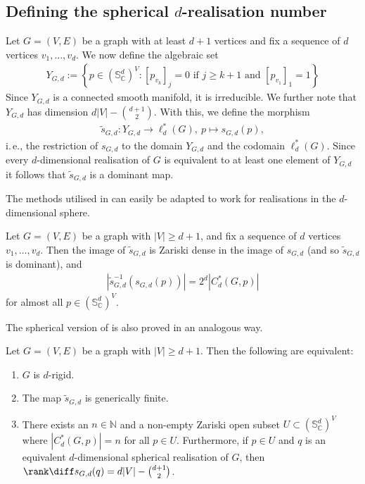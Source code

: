 \subsection{Defining the spherical \texorpdfstring{$d$-realisation}{d-realisation} number}

Let $G=(V,E)$ be a graph with at least $d+1$ vertices and fix a sequence of $d$ vertices $v_1,\ldots, v_d$.
We now define the algebraic set
\begin{align}\label{eq:yset}
	Y_{G,d} := \left\{ p \in (\mathbb{S}^{d}_\mathbb{C})^V : [p_{v_k}]_j=0 \text{ if } j \geq k + 1 \text{ and }  [p_{v_1}]_1=1 \right\}
\end{align}
Since $Y_{G,d}$ is a connected smooth manifold,
it is irreducible.
We further note that $Y_{G,d}$ has dimension $d|V| - \binom{d+1}{2}$.
With this, we define the morphism
\begin{align*}
	\tilde{s}_{G,d} : Y_{G,d} \rightarrow \ell^*_d(G), ~ p \mapsto s_{G,d}(p),
\end{align*}
i.\,e., the restriction of $s_{G,d}$ to the domain $Y_{G,d}$ and the codomain $\ell^*_d(G)$.
Since every $d$-dimensional realisation of $G$ is equivalent to at least one element of $Y_{G,d}$ it follows that $\tilde{s}_{G,d}$ is a dominant map.

The methods utilised in  can easily be adapted to work for realisations in the $d$-dimensional sphere.

\begin{lemma}\label{l:ygd}
	Let $G=(V,E)$ be a graph with $|V| \geq d+1$,
	and fix a sequence of $d$ vertices $v_1,\ldots, v_d$.
	Then the image of $\tilde{s}_{G,d}$ is Zariski dense in the image of $s_{G,d}$ (and so $\tilde{s}_{G,d}$ is dominant),
	and
	\begin{align*}
		\left|\tilde{s}_{G,d}^{-1}\left(s_{G,d}(p) \right) \right| = 2^{d} |C^*_d(G,p)|
	\end{align*}
	for almost all $p \in (\mathbb{S}_\mathbb{C}^d)^V$.
\end{lemma}


The spherical version of  is also proved in an analogous way.


\begin{proposition}\label{p:domsphere}
	Let $G=(V,E)$ be a graph with $|V| \geq d+1$.
	Then the following are equivalent:
	\begin{enumerate}
		\item\label{p:domsphere1} $G$ is $d$-rigid.
		\item\label{p:domsphere2} The map $\tilde{s}_{G,d}$ is generically finite.
		\item\label{p:domsphere3} There exists an $n \in \mathbb{N}$ and a non-empty Zariski open subset $U \subset (\mathbb{S}_\mathbb{C}^d)^V$ where $ |C^*_d(G,p)|=n$ for all $p \in U$.
		Furthermore,
		if $p \in U$ and $q$ is an equivalent $d$-dimensional spherical realisation of $G$,
		then $\rank \diff s_{G,d}(q) =  d|V| - \binom{d+1}{2}$.
	\end{enumerate}
\end{proposition} 

